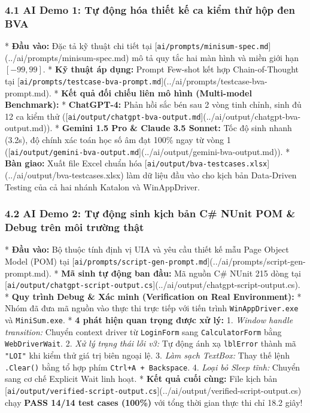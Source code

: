 \subsubsection{4.1 AI Demo 1: Tự động hóa thiết kế ca kiểm thử hộp đen BVA}
* \textbf{Đầu vào:} Đặc tả kỹ thuật chi tiết tại [\texttt{ai/prompts/minisum-spec.md}](../ai/prompts/minisum-spec.md) mô tả quy tắc hai màn hình và miền giới hạn $[-99, 99]$.
* \textbf{Kỹ thuật áp dụng:} Prompt Few-shot kết hợp Chain-of-Thought tại [\texttt{ai/prompts/testcase-bva-prompt.md}](../ai/prompts/testcase-bva-prompt.md).
* \textbf{Kết quả đối chiếu liên mô hình (Multi-model Benchmark):}
  * \textbf{ChatGPT-4:} Phản hồi sắc bén sau 2 vòng tinh chỉnh, sinh đủ 12 ca kiểm thử ([\texttt{ai/output/chatgpt-bva-output.md}](../ai/output/chatgpt-bva-output.md)).
  * \textbf{Gemini 1.5 Pro & Claude 3.5 Sonnet:} Tốc độ sinh nhanh (3.2s), độ chính xác toán học số âm đạt 100\% ngay từ vòng 1 ([\texttt{ai/output/gemini-bva-output.md}](../ai/output/gemini-bva-output.md)).
* \textbf{Bàn giao:} Xuất file Excel chuẩn hóa [\texttt{ai/output/bva-testcases.xlsx}](../ai/output/bva-testcases.xlsx) làm dữ liệu đầu vào cho kịch bản Data-Driven Testing của cả hai nhánh Katalon và WinAppDriver.

\subsubsection{4.2 AI Demo 2: Tự động sinh kịch bản C# NUnit POM \& Debug trên môi trường thật}
* \textbf{Đầu vào:} Bộ thuộc tính định vị UIA và yêu cầu thiết kế mẫu Page Object Model (POM) tại [\texttt{ai/prompts/script-gen-prompt.md}](../ai/prompts/script-gen-prompt.md).
* \textbf{Mã sinh tự động ban đầu:} Mã nguồn C# NUnit 215 dòng tại [\texttt{ai/output/chatgpt-script-output.cs}](../ai/output/chatgpt-script-output.cs).
* \textbf{Quy trình Debug & Xác minh (Verification on Real Environment):}
  * Nhóm đã đưa mã nguồn vào thực thi trực tiếp với tiến trình \texttt{WinAppDriver.exe} và \texttt{MiniSum.exe}.
  * \textbf{4 phát hiện quan trọng được xử lý:}
    1. \textit{Window handle transition:} Chuyển context driver từ \texttt{LoginForm} sang \texttt{CalculatorForm} bằng \texttt{WebDriverWait}.
    2. \textit{Xử lý trạng thái lỗi v3:} Tự động ánh xạ \texttt{lblError} thành mã \texttt{"LOI"} khi kiểm thử giá trị biên ngoại lệ.
    3. \textit{Làm sạch TextBox:} Thay thế lệnh \texttt{.Clear()} bằng tổ hợp phím \texttt{Ctrl+A + Backspace}.
    4. \textit{Loại bỏ Sleep tĩnh:} Chuyển sang cơ chế Explicit Wait linh hoạt.
* \textbf{Kết quả cuối cùng:} File kịch bản [\texttt{ai/output/verified-script-output.cs}](../ai/output/verified-script-output.cs) chạy \textbf{PASS 14/14 test cases (100\%)} với tổng thời gian thực thi chỉ 18.2 giây!


